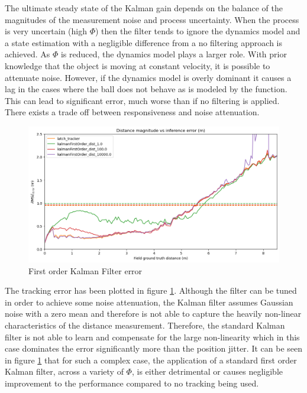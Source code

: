 \documentclass[a4paper,twoside,12pt]{report}
\begin{document}
The ultimate steady state of the Kalman gain depends on the balance of the magnitudes of the measurement noise and process uncertainty. When the process is very uncertain (high $\Phi$) then the filter tends to ignore the dynamics model and a state estimation with a negligible difference from a no filtering approach is achieved. As $\Phi$ is reduced, the dynamics model plays a larger role. With prior knowledge that the object is moving at constant velocity, it is possible to attenuate noise. However, if the dynamics model is overly dominant it causes a lag in the cases where the ball does not behave as is modeled by the function. This can lead to significant error, much worse than if no filtering is applied. There exists a trade off between responsiveness and noise attenuation.

\begin{figure}[h!]
\begin{center}
\includegraphics[width=14cm]{images/fok_error.png}
\caption{First order Kalman Filter error}
\label{fig:fokerror}
\end{center}
\end{figure}

The tracking error has been plotted in figure \ref{fig:fokerror}. Although the filter can be tuned in order to achieve some noise attenuation, the Kalman filter assumes Gaussian noise with a zero mean and therefore is not able to capture the heavily non-linear characteristics of the distance measurement. Therefore, the standard Kalman filter is not able to learn and compensate for the large non-linearity which in this case dominates the error significantly more than the position jitter. It can be seen in figure \ref{fig:fokerror} that for such a complex case, the application of a standard first order Kalman filter, across a variety of $\Phi$, is either detrimental or causes negligible improvement to the performance compared to no tracking being used.
\end{document}
